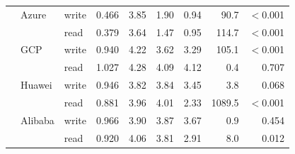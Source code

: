 \begin{tabular}{lllrrrrrr}
 & Azure & write & 0.466 & 3.85 & 1.90 & 0.94 & 90.7 & $<$0.001 \\
 &  & read & 0.379 & 3.64 & 1.47 & 0.95 & 114.7 & $<$0.001 \\
 & GCP & write & 0.940 & 4.22 & 3.62 & 3.29 & 105.1 & $<$0.001 \\
 &  & read & 1.027 & 4.28 & 4.09 & 4.12 & 0.4 & 0.707 \\
 & Huawei & write & 0.946 & 3.82 & 3.84 & 3.45 & 3.8 & 0.068 \\
 &  & read & 0.881 & 3.96 & 4.01 & 2.33 & 1089.5 & $<$0.001 \\
 & Alibaba & write & 0.966 & 3.90 & 3.87 & 3.67 & 0.9 & 0.454 \\
 &  & read & 0.920 & 4.06 & 3.81 & 2.91 & 8.0 & 0.012 \\
\bottomrule
\end{tabular}
